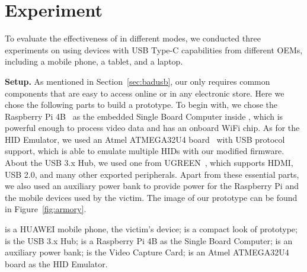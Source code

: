 \section{Experiment}
\label{sec:experiment}


To evaluate the effectiveness of \tool in different modes, we conducted three
experiments on \tool using devices with \ac{USB} Type-C capabilities from different
\acp{OEM}, including a mobile phone, a tablet, and a laptop.

\textbf{Setup.}
As mentioned in Section~\ref{sec:badusb},
our \tool only requires common components that are easy to access online or
in any electronic store. Here we chose the following parts to build a
prototype. To begin with, we chose the Raspberry Pi 4B~\cite{pi4b} as the embedded Single Board
Computer inside \tool, which is powerful enough to process video data and has
an onboard WiFi chip. As for the \ac{HID} Emulator, we used an Atmel ATMEGA32U4 board~\cite{atmel}
with \ac{USB} protocol support, which is able to emulate multiple \acp{HID}
with our modified firmware. About the \ac{USB} 3.x Hub, we used one from
UGREEN~\cite{ugreen}, which supports HDMI, \ac{USB} 2.0, and many other exported peripherals.
Apart from these essential parts, we also used an auxiliary power bank to
provide power for the Raspberry Pi and the mobile devices used by the victim.
The image of our \tool prototype can be found in Figure~\ref{fig:armory}.

 is a HUAWEI mobile phone, the victim's device;  is a compact look of \tool prototype;  is the \ac{USB} 3.x Hub;  is a Raspberry Pi 4B as the Single Board Computer;  is an auxiliary power bank;  is the Video Capture Card;  is an Atmel ATMEGA32U4 board as the \ac{HID} Emulator.


